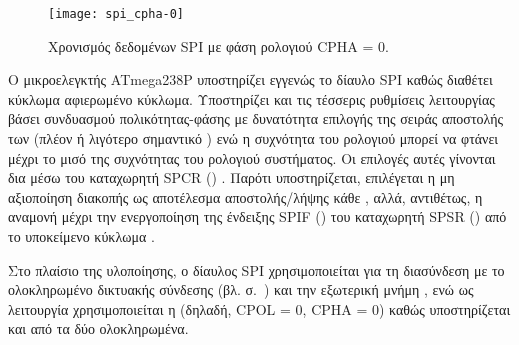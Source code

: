 \begin{figure}
    \caption{Χρονισμός δεδομένων SPI με φάση ρολογιού CPHA = 0.
    \label{fig:spi:cpha-0}}
    \begin{center}
    \texttt{[image: spi\_cpha-0]}
    \end{center}
\end{figure}

Ο μικροελεγκτής ATmega238P υποστηρίζει εγγενώς το δίαυλο SPI καθώς διαθέτει
κύκλωμα αφιερωμένο κύκλωμα. Υποστηρίζει και τις τέσσερις ρυθμίσεις λειτουργίας
βάσει συνδυασμού πολικότητας-φάσης με δυνατότητα επιλογής της σειράς αποστολής
των  (πλέον ή λιγότερο σημαντικό ) ενώ η συχνότητα του ρολογιού
μπορεί να φτάνει μέχρι το μισό της συχνότητας του ρολογιού συστήματος. Οι
επιλογές αυτές γίνονται δια μέσω του καταχωρητή SPCR ()
\parencite[169]{atmel13}. Παρότι υποστηρίζεται, επιλέγεται η μη αξιοποίηση
διακοπής ως αποτέλεσμα αποστολής\slash{}λήψης κάθε , αλλά, αντιθέτως, η
αναμονή μέχρι την ενεργοποίηση της ένδειξης SPIF () του
καταχωρητή SPSR () από το υποκείμενο κύκλωμα
\parencite[167,170]{atmel13}.

Στο πλαίσιο της υλοποίησης, ο δίαυλος SPI χρησιμοποιείται για τη διασύνδεση με
το ολοκληρωμένο δικτυακής σύνδεσης (βλ. 
σ.~\pageref{sec:w5100}) και την εξωτερική μνήμη ,
ενώ ως λειτουργία χρησιμοποιείται η  (δηλαδή, CPOL = 0, CPHA = 0)
καθώς υποστηρίζεται και από τα δύο ολοκληρωμένα.
